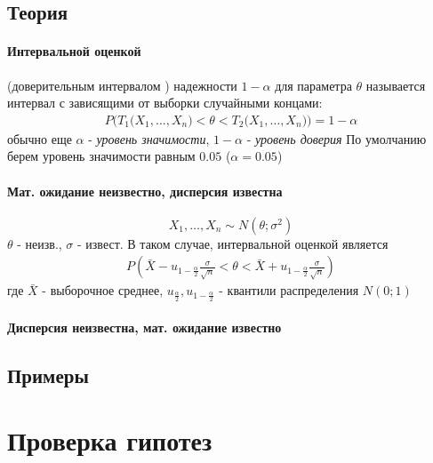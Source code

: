 \documentclass[12pt]{extarticle}
\begin{document}
\subsection*{Теория}
\paragraph{Интервальной оценкой}
(доверительным интервалом ) надежности
$1-\alpha$ для параметра $\theta$ называется интервал с зависящими от выборки
случайными концами:
\begin{eqnarray*}
    P\Big(T_{1}\big(X_{1},\ldots,X_{n}\big)<\theta <
    T_{2}\big(X_{1},\ldots,X_{n}\big)\Big)=1-\alpha
\end{eqnarray*}
обычно еще $\alpha$ - \textit{уровень значимости}, $1-\alpha$ - \textit{уровень доверия}  По умолчанию берем уровень значимости равным $0.05$
($\alpha=0.05$)

\paragraph{Мат. ожидание неизвестно, дисперсия известна}

\[X_{1},\ldots,X_{n}\sim N(\theta;\sigma^{2})\]
$\theta$ - неизв., $\sigma$ - извест. В таком случае, интервальной
оценкой является
\begin{eqnarray*}
    P(
    \bar{X}-u_{1-\frac{\alpha}{2}}\frac{\sigma}{\sqrt{n}}
    < \theta <
    \bar{X}+u_{1-\frac{\alpha}{2}}\frac{\sigma}{\sqrt{n}})
\end{eqnarray*}
где $\bar{X}$ - выборочное среднее,
$u_{\frac{\alpha}{2}},u_{1-\frac{\alpha}{2}}$ - квантили
распределения $N(0;1)$

\paragraph{Дисперсия неизвестна, мат. ожидание известно}

\subsection{Примеры}

\section{Проверка гипотез}
\end{document}
